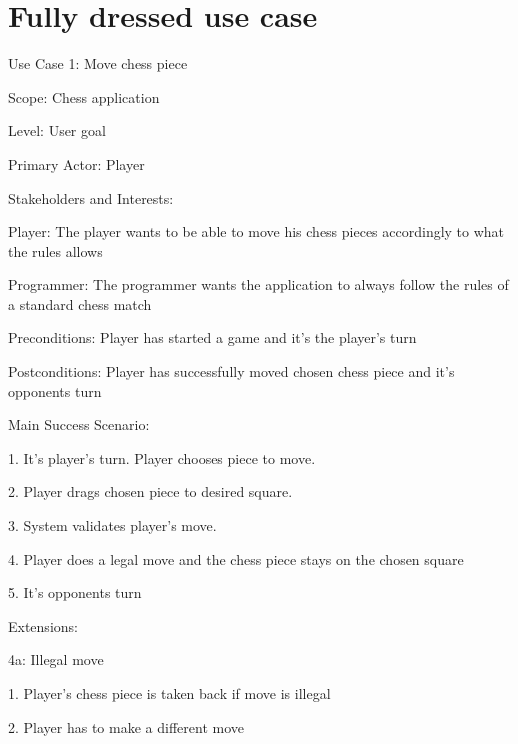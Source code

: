 \documentclass[letterpaper,11pt]{article}
\begin{document}
\section*{Fully dressed use case}

\begin{list}{}{}
	\item Use Case 1: Move chess piece
	\item Scope: Chess application
	\item Level: User goal
	\item Primary Actor: Player
	\item Stakeholders and Interests:
	\item \begin{list}{}{}
			\item Player: The player wants to be able to move his chess pieces accordingly to what the rules allows
			\item Programmer: The programmer wants the application to always follow the rules of a standard chess match
		\end{list}
	\item Preconditions: Player has started a game and it's the player's turn
	\item Postconditions: Player has successfully moved chosen chess piece and it's opponents turn
	\item Main Success Scenario:
	\item \begin{list}{}{}
			\item 1. It's player's turn. Player chooses piece to move.
			\item 2. Player drags chosen piece to desired square.
			\item 3. System validates player's move.
			\item 4. Player does a legal move and the chess piece stays on the chosen square
			\item 5. It's opponents turn
		\end{list}
	\item	Extensions:
	\item \begin{list}{}{}
			\item 4a: Illegal move
			\item \begin{list}{}{}
					\item 1. Player's chess piece is taken back if move is illegal
					\item 2. Player has to make a different move
				\end{list}

\end{list}
\end{list}
\end{document}

